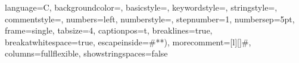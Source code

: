 
\lstset
{
	language=C,
	backgroundcolor=\color{white},
	basicstyle=\footnotesize\ttfamily,
	keywordstyle=\color{magenta},
	stringstyle=\color{orange},
	commentstyle=\color{brown},
	numbers=left,
	numberstyle=\tiny,
	stepnumber=1,
	numbersep=5pt,
	frame=single,
	tabsize=4,
	captionpos=t,
	breaklines=true,
	breakatwhitespace=true,
	escapeinside={\#*}{*)},
	morecomment=[l][\color{magenta}]{\#},
	columns=fullflexible,
	showstringspaces=false
}

\usepackage{pgfplots}
\usetikzlibrary{datavisualization}
\usetikzlibrary{datavisualization.formats.functions}

\usepackage{dcolumn}


\usepackage{graphicx}

\usepackage[justification=centering]{caption} %

\usepackage[unicode,pdftex]{hyperref} %
\hypersetup{hidelinks}

\usepackage{csvsimple}

\usepackage{ragged2e}

\newcommand{\code}[1]{\texttt{#1}}

\usepackage{array, multirow, bigdelim, makecell} 

\usepackage{tikz}
\usetikzlibrary{graphs}

\usepackage{longtable} %